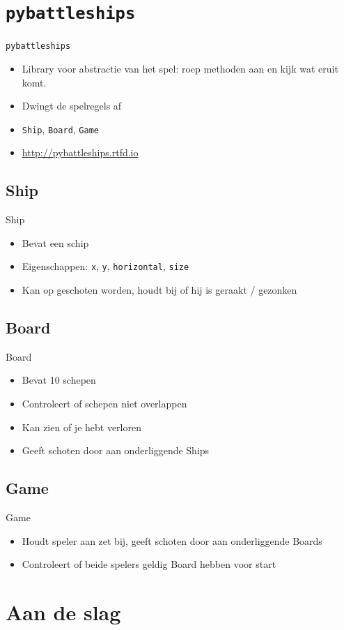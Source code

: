 \documentclass{beamer}
\begin{document}
\section{\texttt{pybattleships}}
\begin{frame}{\texttt{pybattleships}}
	\begin{itemize}
		\item Library voor abstractie van het spel: roep methoden aan en kijk wat eruit komt.
		\item Dwingt de spelregels af
		\item \texttt{Ship}, \texttt{Board}, \texttt{Game}
		\item \url{http://pybattleships.rtfd.io}
	\end{itemize}
\end{frame}

\subsection{Ship}
\begin{frame}{Ship}
	\begin{itemize}
		\item Bevat een schip
		\item Eigenschappen: \texttt{x}, \texttt{y}, \texttt{horizontal}, \texttt{size}
		\item Kan op geschoten worden, houdt bij of hij is geraakt / gezonken
	\end{itemize}
\end{frame}

\subsection{Board}
\begin{frame}{Board}
	\begin{itemize}
		\item Bevat 10 schepen
		\item Controleert of schepen niet overlappen
		\item Kan zien of je hebt verloren
		\item Geeft schoten door aan onderliggende Ships
	\end{itemize}
\end{frame}

\subsection{Game}
\begin{frame}{Game}
	\begin{itemize}
		\item Houdt speler aan zet bij, geeft schoten door aan onderliggende Boards
		\item Controleert of beide spelers geldig Board hebben voor start
	\end{itemize}
\end{frame}

\section{Aan de slag}
\end{document}
